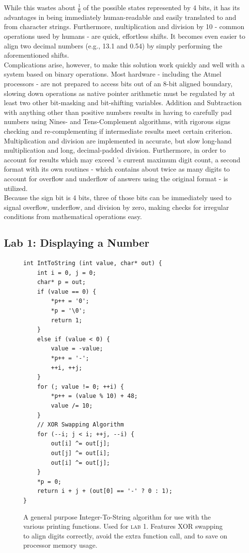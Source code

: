 \documentclass{LibHP20b}
\begin{document}
While this wastes about $\frac{1}{6}$ of the possible states represented by 4 bits, it has its advantages in being immediately human-readable and easily translated to and from character strings. Furthermore, multiplication and division by 10 - common operations used by humans - are quick, effortless shifts. It becomes even easier to align two decimal numbers (e.g., 13.1 and 0.54) by simply performing the aforementioned shifts.\\
Complications arise, however, to make this solution work quickly and well with a system based on binary operations. Most hardware - including the Atmel processors - are not prepared to access bits out of an 8-bit aligned boundary, slowing down operations as native pointer arithmetic must be regulated by at least two other bit-masking and bit-shifting variables. Addition and Subtraction with anything other than positive numbers results in having to carefully pad numbers using Nines- and Tens-Complement algorithms, with rigorous signs checking and re-complementing if intermediate results meet certain criterion. Multiplication and division are implemented in accurate, but slow long-hand multiplication and long, decimal-padded division. Furthermore, in order to account for results which may exceed 's current maximum digit count, a second format  with its own routines - which contains about twice as many digits to account for overflow and underflow of answers using the original  format - is utilized.\\
Because the sign bit is 4 bits, three of those bits can be immediately used to signal overflow, underflow, and division by zero, making checks for irregular conditions from mathematical operations easy.

\subsection{Lab 1: Displaying a Number}
\label{sec:display}

\begin{figure}
\begin{lstlisting}
int IntToString (int value, char* out) {
	int i = 0, j = 0;
	char* p = out;
	if (value == 0) {
		*p++ = '0';
		*p = '\0';
		return 1;
	}
	else if (value < 0) {
		value = -value;
		*p++ = '-';
		++i, ++j;
	}
	for (; value != 0; ++i) {
		*p++ = (value % 10) + 48;
		value /= 10;
	}
	// XOR Swapping Algorithm
	for (--i; j < i; ++j, --i) {
		out[i] ^= out[j];
		out[j] ^= out[i];
		out[i] ^= out[j];
	}
	*p = 0;
	return i + j + (out[0] == '-' ? 0 : 1);
}
\end{lstlisting}
\caption{A general purpose Integer-To-String algorithm for use with the various printing functions. Used for \textsc{lab 1}. Features XOR swapping to align digits correctly, avoid the extra function call, and to save on processor memory usage.}
\label{fig:lab1}
\end{figure}
\end{document}
